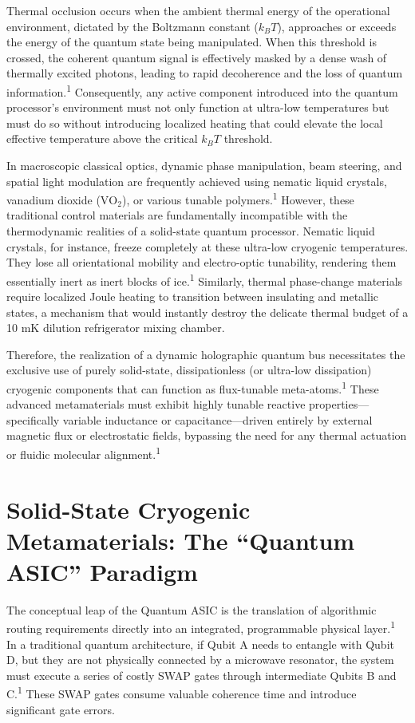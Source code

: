 \documentclass[11pt, a4paper]{article}
\begin{document}
Thermal occlusion occurs when the ambient thermal energy of the operational environment, dictated by the Boltzmann constant ($k_B T$), approaches or exceeds the energy of the quantum state being manipulated. When this threshold is crossed, the coherent quantum signal is effectively masked by a dense wash of thermally excited photons, leading to rapid decoherence and the loss of quantum information.\textsuperscript{1} Consequently, any active component introduced into the quantum processor's environment must not only function at ultra-low temperatures but must do so without introducing localized heating that could elevate the local effective temperature above the critical $k_B T$ threshold.

In macroscopic classical optics, dynamic phase manipulation, beam steering, and spatial light modulation are frequently achieved using nematic liquid crystals, vanadium dioxide ($\text{VO}_2$), or various tunable polymers.\textsuperscript{1} However, these traditional control materials are fundamentally incompatible with the thermodynamic realities of a solid-state quantum processor. Nematic liquid crystals, for instance, freeze completely at these ultra-low cryogenic temperatures. They lose all orientational mobility and electro-optic tunability, rendering them essentially inert as inert blocks of ice.\textsuperscript{1} Similarly, thermal phase-change materials require localized Joule heating to transition between insulating and metallic states, a mechanism that would instantly destroy the delicate thermal budget of a 10 mK dilution refrigerator mixing chamber.

Therefore, the realization of a dynamic holographic quantum bus necessitates the exclusive use of purely solid-state, dissipationless (or ultra-low dissipation) cryogenic components that can function as flux-tunable meta-atoms.\textsuperscript{1} These advanced metamaterials must exhibit highly tunable reactive properties---specifically variable inductance or capacitance---driven entirely by external magnetic flux or electrostatic fields, bypassing the need for any thermal actuation or fluidic molecular alignment.\textsuperscript{1}

\section*{Solid-State Cryogenic Metamaterials: The ``Quantum ASIC'' Paradigm}

The conceptual leap of the Quantum ASIC is the translation of algorithmic routing requirements directly into an integrated, programmable physical layer.\textsuperscript{1} In a traditional quantum architecture, if Qubit A needs to entangle with Qubit D, but they are not physically connected by a microwave resonator, the system must execute a series of costly SWAP gates through intermediate Qubits B and C.\textsuperscript{1} These SWAP gates consume valuable coherence time and introduce significant gate errors.
\end{document}
